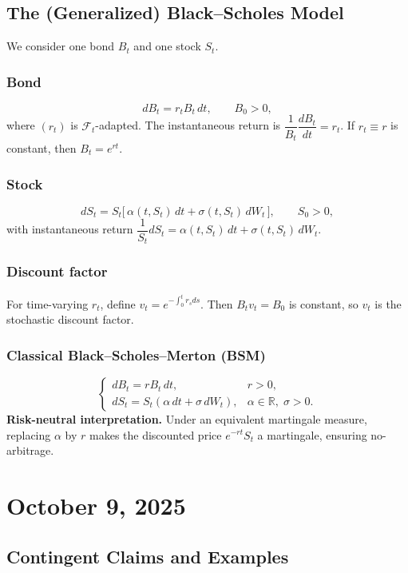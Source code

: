 \documentclass[12pt,a4paper]{article}
\theoremstyle{definition}
\newcommand{\R}{\mathbb{R}}
\begin{document}
\subsection{The (Generalized) Black--Scholes Model}

We consider one bond $B_t$ and one stock $S_t$.

\subsubsection*{Bond}
\[
 dB_t = r_t B_t\, dt, \qquad B_0>0,
\]
where $(r_t)$ is $\mathcal{F}_t$-adapted. The instantaneous return is $\dfrac{1}{B_t}\dfrac{dB_t}{dt}=r_t$. If $r_t\equiv r$ is constant, then $B_t = e^{rt}$.

\subsubsection*{Stock}
\[
 dS_t = S_t\big[\,\alpha(t,S_t)\, dt + \sigma(t,S_t)\, dW_t\,\big], \qquad S_0>0,
\]
with instantaneous return $\dfrac{1}{S_t} dS_t = \alpha(t,S_t)\, dt + \sigma(t,S_t)\, dW_t$.

\subsubsection*{Discount factor}
For time-varying $r_t$, define $v_t = e^{-\int_0^t r_s ds}$. Then $B_t v_t = B_0$ is constant, so $v_t$ is the stochastic discount factor.

\subsubsection*{Classical Black--Scholes--Merton (BSM)}
\[
 \begin{cases}
 dB_t = r B_t\, dt, & r>0, \\
 dS_t = S_t(\alpha\, dt + \sigma\, dW_t), & \alpha\in\R,\; \sigma>0.
 \end{cases}
\]
\textbf{Risk-neutral interpretation.} Under an equivalent martingale measure, replacing $\alpha$ by $r$ makes the discounted price $e^{-rt} S_t$ a martingale, ensuring no-arbitrage.

\newpage
\section{October 9, 2025}

\subsection{Contingent Claims and Examples}
\end{document}

